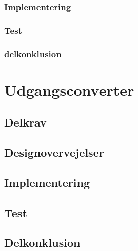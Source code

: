 \documentclass[../main.tex]{subfiles}
\begin{document}
        \subsubsection{Implementering}
        
        \subsubsection{Test}
        
        \subsubsection{delkonklusion}
    
        
        
\section{Udgangsconverter}

    \subsection{Delkrav}
    
    \subsection{Designovervejelser}
    
    \subsection{Implementering}
    
    \subsection{Test}
    
    \subsection{Delkonklusion}
\end{document}
